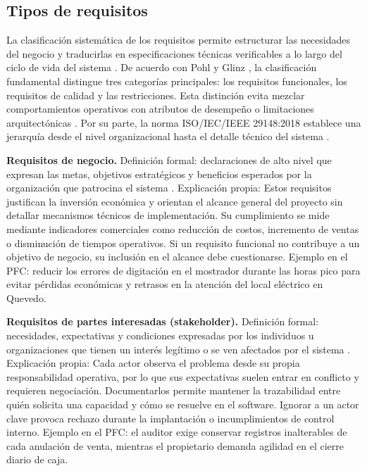 \documentclass[onecolumn,12pt,a4paper]{IEEEtran}
\begin{document}
	\subsection{Tipos de requisitos}

	La clasificaci\'on sistem\'atica de los requisitos permite estructurar las necesidades del negocio y traducirlas en especificaciones t\'ecnicas verificables a lo largo del ciclo de vida del sistema \cite{iso29148,iso15288,iso12207}. De acuerdo con Pohl \cite{pohl2025} y Glinz \cite{glinz2007}, la clasificaci\'on fundamental distingue tres categor\'ias principales: los requisitos funcionales, los requisitos de calidad y las restricciones. Esta distinci\'on evita mezclar comportamientos operativos con atributos de desempe\~no o limitaciones arquitect\'onicas \cite{pohl2025,glinz2007}. Por su parte, la norma ISO/IEC/IEEE 29148:2018 establece una jerarqu\'ia desde el nivel organizacional hasta el detalle t\'ecnico del sistema \cite{iso29148}.

	\textbf{Requisitos de negocio.} Definici\'on formal: declaraciones de alto nivel que expresan las metas, objetivos estrat\'egicos y beneficios esperados por la organizaci\'on que patrocina el sistema \cite{iso29148,wiegers2013}. Explicaci\'on propia: Estos requisitos justifican la inversi\'on econ\'omica y orientan el alcance general del proyecto sin detallar mecanismos t\'ecnicos de implementaci\'on. Su cumplimiento se mide mediante indicadores comerciales como reducci\'on de costos, incremento de ventas o disminuci\'on de tiempos operativos. Si un requisito funcional no contribuye a un objetivo de negocio, su inclusi\'on en el alcance debe cuestionarse. Ejemplo en el PFC: reducir los errores de digitaci\'on en el mostrador durante las horas pico para evitar p\'erdidas econ\'omicas y retrasos en la atenci\'on del local el\'ectrico en Quevedo.

	\textbf{Requisitos de partes interesadas (stakeholder).} Definici\'on formal: necesidades, expectativas y condiciones expresadas por los individuos u organizaciones que tienen un inter\'es leg\'itimo o se ven afectados por el sistema \cite{iso29148,pmbok7}. Explicaci\'on propia: Cada actor observa el problema desde su propia responsabilidad operativa, por lo que sus expectativas suelen entrar en conflicto y requieren negociaci\'on. Documentarlos permite mantener la trazabilidad entre qui\'en solicita una capacidad y c\'omo se resuelve en el software. Ignorar a un actor clave provoca rechazo durante la implantaci\'on o incumplimientos de control interno. Ejemplo en el PFC: el auditor exige conservar registros inalterables de cada anulaci\'on de venta, mientras el propietario demanda agilidad en el cierre diario de caja.
\end{document}
